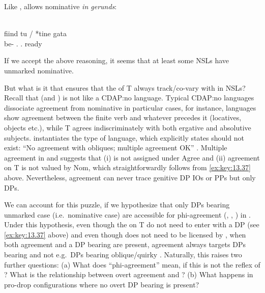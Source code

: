 \documentclass[output=paper]{langsci/langscibook}
\begin{document}
\begin{exe}
Like ,  allows nominative \emph{in
gerunds}:

\ea\label{ex:key:13.42} \citep{Alboiu2009}\\
    \gll fiind tu / *tine gata\\
    be-\Ger{}    \Ssg.\Nom{} {} \hphantom{*}\Ssg.\Acc{} ready\\
    \glt
\z

If we accept the above reasoning, it seems that at least some \glspl{NSL} have
unmarked nominative.

But what is it that ensures that the  of T always track/co-vary
with \Nom{} in \glspl{NSL}? Recall that  (and ) is not
like a \gls{CDAP}:no language. Typical \gls{CDAP}:no languages dissociate
agreement from nominative in particular cases, for instance, 
languages show agreement between the finite verb and whatever precedes it
(locatives, objects etc.), while  T agrees indiscriminately
with both ergative and absolutive subjects.
 instantiates the type of language, which \citet{Baker2008}
explicitly states should not exist: “No agreement with obliques; multiple
agreement OK” \parencite[223, (113d)]{Baker2008}. Multiple agreement in
 and  suggests that (i) \Nom{} is not assigned under
Agree and (ii) agreement on T is not valued by Nom, which straightforwardly
follows from \eqref{ex:key:13.37} above.  Nevertheless, agreement can never
trace genitive DP \glspl{IO} or PPs but only \Nom{} DPs.

We can account for this puzzle, if we hypothesize that only DPs bearing
unmarked case (i.e.\ nominative case) are accessible for
phi-agreement (\citealt{Bobaljik2008}, \citealt{Preminger2014},
\citealt{Baker2015}) in . Under this hypothesis, even though the
 on T do not need to enter  with a DP (see
\eqref{ex:key:13.37} above) and even though \Nom{} does not need to be licensed
by , when both agreement and a DP bearing \Nom{} are present,
agreement always targets DPs bearing \Nom{} and not e.g.\ DPs bearing
oblique/quirky \Gen. Naturally, this raises two further questions: (a) What
does \enquote{phi-agreement} mean, if this is not the reflex of ?
What is the relationship between overt agreement and ? (b) What
happens in pro-drop configurations where no overt DP bearing \Nom{} is present?


\end{exe}
\end{document}
